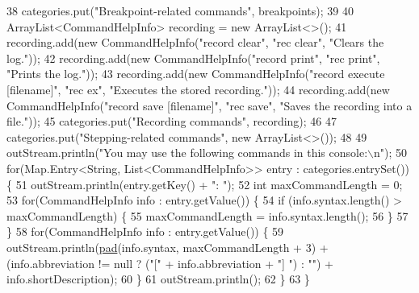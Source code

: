 \begin{DoxyCode}
38     categories.put(\textcolor{stringliteral}{"Breakpoint-related commands"}, breakpoints);
39 
40     ArrayList<CommandHelpInfo> recording = \textcolor{keyword}{new} ArrayList<>();
41     recording.add(\textcolor{keyword}{new} CommandHelpInfo(\textcolor{stringliteral}{"record clear"}, \textcolor{stringliteral}{"rec clear"}, \textcolor{stringliteral}{"Clears the log."}));
42     recording.add(\textcolor{keyword}{new} CommandHelpInfo(\textcolor{stringliteral}{"record print"}, \textcolor{stringliteral}{"rec print"}, \textcolor{stringliteral}{"Prints the log."}));
43     recording.add(\textcolor{keyword}{new} CommandHelpInfo(\textcolor{stringliteral}{"record execute [filename]"}, \textcolor{stringliteral}{"rec ex"}, \textcolor{stringliteral}{"Executes the stored
       recording."}));
44     recording.add(\textcolor{keyword}{new} CommandHelpInfo(\textcolor{stringliteral}{"record save [filename]"}, \textcolor{stringliteral}{"rec save"}, \textcolor{stringliteral}{"Saves the recording into a
       file."}));
45     categories.put(\textcolor{stringliteral}{"Recording commands"}, recording);
46 
47     categories.put(\textcolor{stringliteral}{"Stepping-related commands"}, \textcolor{keyword}{new} ArrayList<>());
48 
49     outStream.println(\textcolor{stringliteral}{"You may use the following commands in this console:\(\backslash\)n"});
50     \textcolor{keywordflow}{for}(Map.Entry<String, List<CommandHelpInfo>> entry : categories.entrySet()) \{
51       outStream.println(entry.getKey() + \textcolor{stringliteral}{": "});
52       \textcolor{keywordtype}{int} maxCommandLength = 0;
53       \textcolor{keywordflow}{for}(CommandHelpInfo info : entry.getValue()) \{
54         \textcolor{keywordflow}{if} (info.syntax.length() > maxCommandLength) \{
55           maxCommandLength = info.syntax.length();
56         \}
57       \}
58       \textcolor{keywordflow}{for}(CommandHelpInfo info : entry.getValue()) \{
59         outStream.println(\hyperlink{classgov_1_1nasa_1_1jpf_1_1inspector_1_1client_1_1commands_1_1_cmd_help_a4e60e68504586685162106e199e985e3}{pad}(info.syntax, maxCommandLength + 3) + (info.abbreviation != null ? (\textcolor{stringliteral}{"["} + 
      info.abbreviation + \textcolor{stringliteral}{"] "}) : \textcolor{stringliteral}{""}) + info.shortDescription);
60       \}
61       outStream.println();
62     \}
63   \}
\end{DoxyCode}
